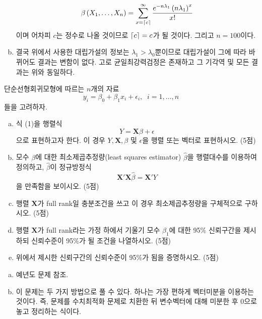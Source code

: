 \documentclass[answers]{exam}
\DeclarePairedDelimiter{\ceil}{\lceil}{\rceil}
\begin{document}
\begin{questions}
\begin{solution}
\begin{enumerate}[(a)]
        \begin{equation}
          \beta\left(X_{1},\ldots,X_{n}\right) = \sum_{x=\ceil{c}}^{\infty}\dfrac{e^{-n\lambda_{1}}\left(n\lambda_{1}\right)^{x}}{x!}
        \end{equation}
        이며 어차피 $c$는 정수로 나올 것이므로 $\ceil{c}=c$가 될 것이다. 그리고 $n=100$이다.
        \item 결국 위에서 사용한 대립가설의 정보는 $\lambda_{1}>\lambda_{0}$뿐이므로 대립가설이 그에 따라 바뀌어도 결과는 변함이 없다. 고로 균일최강력검정은 존재하고 그 기각역 및 모든 결과는 위와 동일하다.
      \end{enumerate}
    \end{solution}
    \question
    단순선형회귀모형에 따르는 $n$개의 자료
    \begin{equation}
      y_{i} = \beta_{0}+\beta_{1}x_{i}+\epsilon_{i},\;\;i=1,\ldots,n
    \end{equation}
    들을 고려하자.
    \begin{enumerate}[(a)]
      \item 식 (1)을 행렬식
      \begin{equation}
        Y=\mathbf{X}\beta+\epsilon
      \end{equation}
      으로 표현하고자 한다. 이 경우 $Y,\mathbf{X},\beta$ 및 $\epsilon$을 행렬 또는 벡터로 표현하시오. (5점)
      \item 모수 $\beta$에 대한 최소제곱추정량(least squares estimator) $\widehat{\beta}$을 행렬대수를 이용하여 정의하고, $\widehat{\beta}$이 정규방정식
      \begin{equation}
        \mathbf{X}'\mathbf{X}\widehat{\beta}=\mathbf{X}'Y
      \end{equation}
      을 만족함을 보이시오. (5점)
      \item 행렬 $\mathbf{X}$가 full rank일 충분조건을 쓰고 이 경우 최소제곱추정량을 구체적으로 구하시오. (5점)
      \item 행렬 $\mathbf{X}$가 full rank라는 가정 하에서 기울기 모수 $\beta_{1}$에 대한 95\% 신뢰구간을 제시하되 신뢰수준이 95\%가 될 조건을 나열하시오. (5점)
      \item 위에서 제시한 신뢰구간의 신뢰수준이 95\%가 됨을 증명하시오. (5점)
    \end{enumerate}
    \begin{solution}
      \begin{enumerate}[(a)]
      \item 예년도 문제 참조.
      \item 이 문제는 두 가지 방법으로 풀 수 있다. 하나는 가장 편하게 벡터미분을 이용하는 것이다. 즉, 문제를 수치최적화 문제로 치환한 뒤 변수벡터에 대해 미분한 후 0으로 놓고 정리하는 식이다.

\end{enumerate}
\end{solution}
\end{questions}
\end{document}
